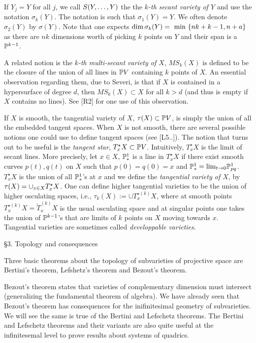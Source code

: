 If 
   $Y_j=Y$ for all $j$, we call $S(Y, \hdots , Y)$ the
the {\it $k$-th secant variety of $Y$} and use
the notation  $ \sigma_k(Y)$.   The notation is such that 
$\sigma_1(Y)=Y$.
We often denote $\sigma_2(Y)$ by $\sigma (Y)$. Note that one expects $\text{dim}\,
\sigma_k(Y)=
\text{ min }\{ nk +k-1, n+a\}$
as there are $nk$ dimensions worth of picking $k$ points on $Y$
and their span is a $\Bbb P^{k-1}$.
  
\smallpagebreak

A related notion  is
the {\it $k$-th multi-secant variety of $X$}, $MS_k(X)$ is defined
to be the closure of the union of all lines in $\Bbb P V$ containing
$k$ points of $X$.   An essential
observation regarding them, due to Severi, is
that if $X$ is contained in a hypersurface of degree $d$, then
$MS_k(X)\subset X$ for all $k>d$ (and thus is empty if $X$ contains
no lines). See [R2] for one use of this observation.



If $X$ is smooth, the tangential variety of $X$,
$\tau (X)\subset\Bbb P V$, is simply the union
of all the embedded tangent spaces. When $X$ is not smooth, there
are several possible notions one could use to define tangent
spaces (see [L5..]).
The notion that turns out to be useful is the 
  {\it tangent star},
$T^{\star}_xX\subset\Bbb P V$. Intuitively,
$T^{\star}_xX$ is the limit of secant lines.
More precisely, let $x\in
X$,
$\Bbb P^1_*$ is a line  
in $T^{\star}_xX$ if there exist smooth
curves
$p(t),q(t)$ on $X$ such that $p(0)=q(0)=x$ and
$\Bbb P^1_* = \text{lim}_{t\rightarrow 0} \Bbb P^1_{pq}$. 
$T^{\star}_xX$ is the union of all $\Bbb P^{1}_*$'s at $x$ and we define
the {\it tangential variety of $X$}, by
$\tau(X)= \cup_{x\in X}T^{\star}_xX$. One can define higher
tangential varieties to be the union of higher osculating spaces,
 i.e.,
$\tau_k(X):=\cup T^{\star (k)}_xX$, where at smooth points
$T^{\star (k)}_xX=\tilde T^{  (k)}_xX$ is the usual osculating space
and at singular points one takes the union of $\Bbb P^{k-1}$'s that are
limits of $k$ points on $X$ moving towards $x$.
Tangential varieties are sometimes called {\it developpable varieties}.


\heading\S 3.   Topology and consequences\endheading

Three basic theorems about the topology of subvarieties of projective
space are Bertini's theorem, Lefshetz's theorem
and Bezout's theorem. 

  Bezout's theorem states
that  varieties of complementary dimension
must intersect (generalizing the fundamental
theorem of algebra). We have already seen that
Bezout's theorem  has consequences for
the inifinitesimal   geometry of subvarieties. We will see the same
is true of the Bertini and Lefschetz theorems. The Bertini and
Lefschetz theorems and  their   variants 
 are also quite useful at the infinitesemal
level to prove results about systems of quadrics.

